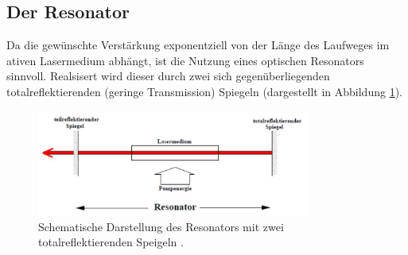 \subsection{Der Resonator}
Da die gewünschte Verstärkung exponentziell von der Länge des Laufweges im ativen Lasermedium abhängt, ist die Nutzung eines optischen Resonators sinnvoll.
Realsisert wird dieser durch zwei sich gegenüberliegenden totalreflektierenden (geringe Transmission) Spiegeln (dargestellt in Abbildung \ref{fig:resonator}).

\begin{figure}
    \center
    \includegraphics[width=0.8\textwidth]{bilder/resonator.jpg}
    \caption{Schematische Darstellung des Resonators mit zwei totalreflektierenden Speigeln \cite{anleitung}.}
    \label{fig:resonator}
\end{figure}